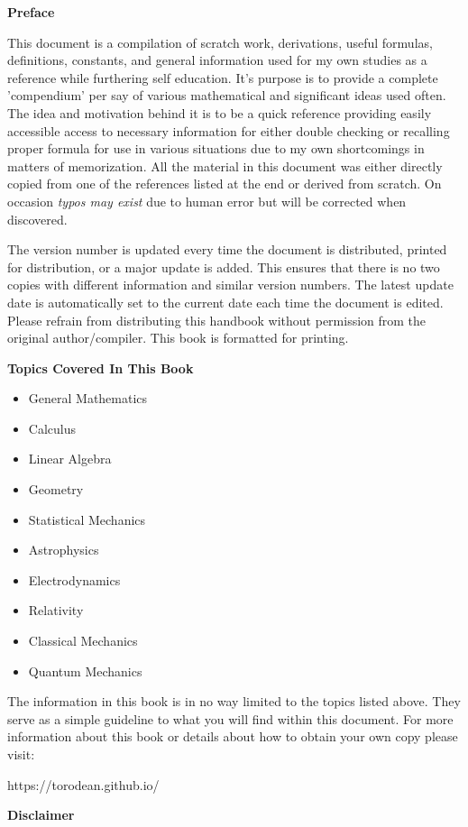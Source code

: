 \begin{center}
	\textbf{Preface}
\end{center}

This document is a compilation of scratch work, derivations, useful formulas, definitions, constants, and general information used for my own studies as a reference while furthering self education. It's purpose is to provide a complete 'compendium' per say of various mathematical and significant ideas used often. The idea and motivation behind it is to be a quick reference providing easily accessible access to necessary information for either double checking or recalling proper formula for use in various situations due to my own shortcomings in matters of memorization. All the material in this document was either directly copied from one of the references listed at the end or derived from scratch. On occasion \textit{typos may exist} due to human error but will be corrected when discovered.
	
The version number is updated every time the document is distributed, printed for distribution, or a major update is added. This ensures that there is no two copies with different information and similar version numbers. The latest update date is automatically set to the current date each time the document is edited. Please refrain from distributing this handbook without permission from the original author/compiler. This book is formatted for printing.

\begin{center}
	\textbf{Topics Covered In This Book}
\end{center}

\begin{multicols}{2}
\begin{itemize}
	\item General Mathematics
	\item Calculus
	\item Linear Algebra
	\item Geometry
	\item Statistical Mechanics
	\item Astrophysics
	\item Electrodynamics
	\item Relativity
	\item Classical Mechanics
	\item Quantum Mechanics
\end{itemize} 
\end{multicols}

The information in this book is in no way limited to the topics listed above. They serve as a simple guideline to what you will find within this document. For more information about this book or details about how to obtain your own copy please visit:
\begin{center}
	https://torodean.github.io/
\end{center}
\begin{center}
	\textbf{Disclaimer}
\end{center}

